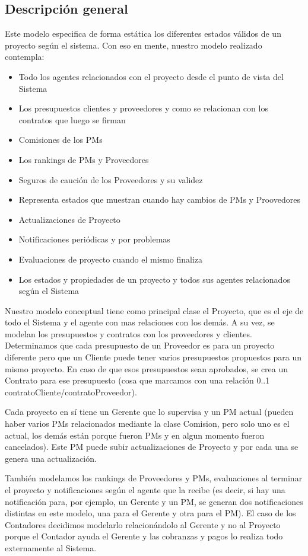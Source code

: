 \subsection{Descripción general}

Este modelo especifica de forma estática los diferentes estados válidos de un proyecto según el sistema. Con eso en mente, nuestro modelo realizado contempla:

\begin{itemize}
	\item Todo los agentes relacionados con el proyecto desde el punto de vista del Sistema
	\item Los presupuestos clientes y proveedores y como se relacionan con los contratos que luego se firman
	\item Comisiones de los PMs
	\item Los rankings de PMs y Proveedores
	\item Seguros de caución de los Proveedores y su validez
	\item Representa estados que muestran cuando hay cambios de PMs y Proovedores
	\item Actualizaciones de Proyecto
	\item Notificaciones periódicas y por problemas
	\item Evaluaciones de proyecto cuando el mismo finaliza
	\item Los estados y propiedades de un proyecto y todos sus agentes relacionados según el Sistema
\end{itemize}

Nuestro modelo conceptual tiene como principal clase el Proyecto, que es el eje de todo el Sistema y el agente con mas relaciones con los demás. A su vez, se modelan los presupuestos y contratos con los proveedores y clientes. Determinamos que cada presupuesto de un Proveedor es para un proyecto diferente pero que un Cliente puede tener varios presupuestos propuestos para un mismo proyecto. En caso de que esos presupuestos sean aprobados, se crea un Contrato para ese presupuesto (cosa que marcamos con una relación 0..1 contratoCliente/contratoProveedor).

Cada proyecto en sí tiene un Gerente que lo supervisa y un PM actual (pueden haber varios PMs relacionados mediante la clase Comision, pero solo uno es el actual, los demás están porque fueron PMs y en algun momento fueron cancelados). Este PM puede subir actualizaciones de Proyecto y por cada una se genera una actualización.

También modelamos los rankings de Proveedores y PMs, evaluaciones al terminar el proyecto y notificaciones según el agente que la recibe (es decir, si hay una notificación para, por ejemplo, un Gerente y un PM, se generan dos notificaciones distintas en este modelo, una para el Gerente y otra para el PM).
El caso de los Contadores decidimos modelarlo relacionándolo al Gerente y no al Proyecto porque el Contador ayuda el Gerente y las cobranzas y pagos lo realiza todo externamente al Sistema.

